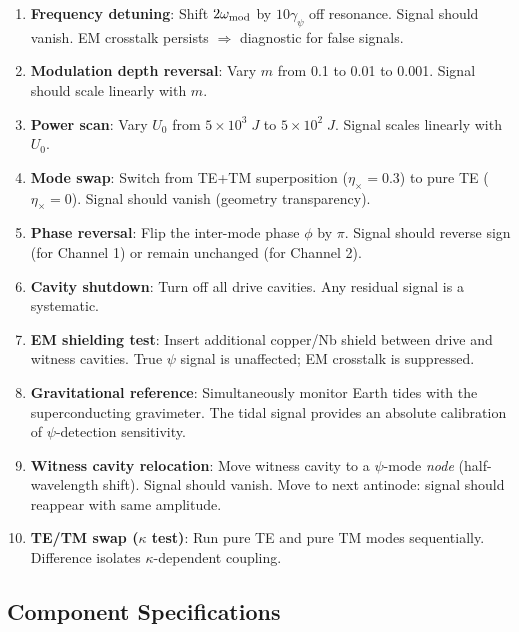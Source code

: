 \documentclass[aps,prd,twocolumn,superscriptaddress,floatfix,nofootinbib]{revtex4-2}
\newcommand{\gpsi}{\gamma_\psi}
\begin{document}
\begin{enumerate}
\item \textbf{Frequency detuning}: Shift $2\omega_{\rm mod}$ by
$10\gpsi$ off resonance. Signal should vanish. EM crosstalk
persists $\Rightarrow$ diagnostic for false signals.

\item \textbf{Modulation depth reversal}: Vary $m$ from 0.1 to 0.01
to 0.001. Signal should scale linearly with $m$.

\item \textbf{Power scan}: Vary $U_0$ from $5\times10^3\;\si{J}$
to $5\times10^2\;\si{J}$. Signal scales linearly with $U_0$.

\item \textbf{Mode swap}: Switch from TE+TM superposition
($\eta_\times = 0.3$) to pure TE ($\eta_\times = 0$). Signal should
vanish (geometry transparency).

\item \textbf{Phase reversal}: Flip the inter-mode phase $\phi$ by
$\pi$. Signal should reverse sign (for Channel 1) or remain unchanged
(for Channel 2).

\item \textbf{Cavity shutdown}: Turn off all drive cavities. Any
residual signal is a systematic.

\item \textbf{EM shielding test}: Insert additional copper/Nb shield
between drive and witness cavities. True $\psi$ signal is unaffected;
EM crosstalk is suppressed.

\item \textbf{Gravitational reference}: Simultaneously monitor Earth
tides with the superconducting gravimeter. The tidal signal provides
an absolute calibration of $\psi$-detection sensitivity.

\item \textbf{Witness cavity relocation}: Move witness cavity to a
$\psi$-mode \emph{node} (half-wavelength shift). Signal should vanish.
Move to next antinode: signal should reappear with same amplitude.

\item \textbf{TE/TM swap ($\kappa$ test)}: Run pure TE and pure TM
modes sequentially. Difference isolates $\kappa$-dependent coupling.
\end{enumerate}

\subsection{Component Specifications}\label{sec:components}
\end{document}
